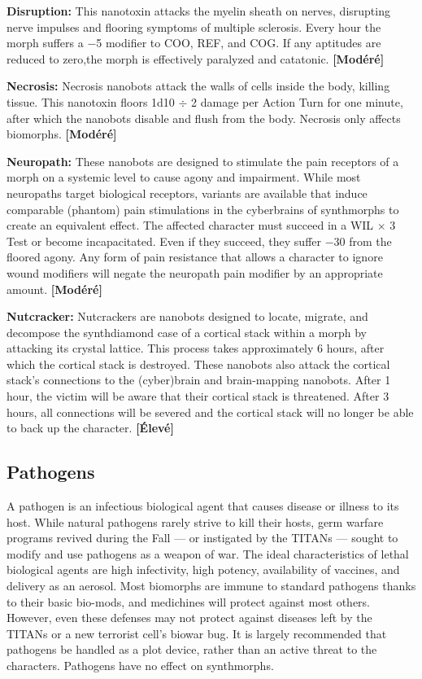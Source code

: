 {{\textbf{Disruption:} This nanotoxin attacks the myelin sheath on nerves, disrupting nerve impulses and flooring symptoms of multiple sclerosis. Every hour the morph suffers a $-$5 modifier to COO, REF, and COG. If any aptitudes are reduced to zero,the morph is effectively paralyzed and catatonic. \textbf{[Modéré]} 

\textbf{Necrosis:} Necrosis nanobots attack the walls of cells inside the body, killing tissue. This nanotoxin floors 1d10 $\div$ 2 damage per Action Turn for one minute, after which the nanobots disable and flush from the body. Necrosis only affects biomorphs. \textbf{[Modéré]} 

\textbf{Neuropath:} These nanobots are designed to stimulate the pain receptors of a morph on a systemic level to cause agony and impairment. While most neuropaths target biological receptors, variants are available that induce comparable (phantom) pain stimulations in the cyberbrains of synthmorphs to create an equivalent effect. The affected character must succeed in a WIL $\times$ 3 Test or become incapacitated. Even if they succeed, they suffer $-$30 from the floored agony. Any form of pain resistance that allows a character to ignore wound modifiers will negate the neuropath pain modifier by an appropriate amount. \textbf{[Modéré]} 

\textbf{Nutcracker:} Nutcrackers are nanobots designed to locate, migrate, and decompose the synthdiamond case of a cortical stack within a morph by attacking its crystal lattice. This process takes approximately 6 hours, after which the cortical stack is destroyed. These nanobots also attack the cortical stack’s connections to the (cyber)brain and brain-mapping nanobots. After 1 hour, the victim will be aware that their cortical stack is threatened. After 3 hours, all connections will be severed and the cortical stack will no longer be able to back up the character. \textbf{[Élevé]} 



\subsection{Pathogens} \label{sec:pathogens} 

A pathogen is an infectious biological agent that causes disease or illness to its host. While natural pathogens rarely strive to kill their hosts, germ warfare programs revived during the Fall --- or instigated by the TITANs --- sought to modify and use pathogens as a weapon of war. The ideal characteristics of lethal biological agents are high infectivity, high potency, availability of vaccines, and delivery as an aerosol. Most biomorphs are immune to standard pathogens thanks to their basic bio-mods, and medichines will protect against most others. However, even these defenses may not protect against diseases left by the TITANs or a new terrorist cell’s biowar bug. It is largely recommended that pathogens be handled as a plot device, rather than an active threat to the characters. Pathogens have no effect on synthmorphs. 

}}
